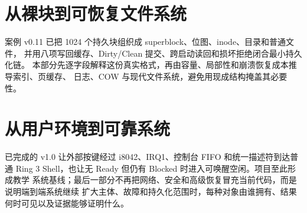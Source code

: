 \documentclass[UTF8,openany,zihao=5,fontset=none]{ctexbook}
\begin{document}
\part{从裸块到可恢复文件系统}
\begin{partbridge}
案例 v0.11 已把 1024 个持久块组织成 superblock、位图、inode、目录和普通文件，
并用八项写回缓存、Dirty/Clean 提交、跨启动读回和损坏拒绝闭合最小持久化链。
本部分先逐字段解释这份真实格式，再由容量、局部性和崩溃恢复成本推导索引、页缓存、
日志、COW 与现代文件系统，避免用现成结构掩盖其必要性。
\end{partbridge}






\part{从用户环境到可靠系统}
\begin{partbridge}
已完成的 v1.0 让外部按键经过 i8042、IRQ1、控制台 FIFO 和统一描述符到达普通
Ring 3 Shell，也让无 Ready 但仍有 Blocked 时进入可唤醒空闲。项目至此形成教学
系统基线；最后一部分不再把网络、安全和高级恢复冒充当前代码，而是说明端到端系统继续
扩大主体、故障和持久化范围时，每种对象由谁拥有、结果何时可见以及证据能够证明什么。
\end{partbridge}





\backmatter




\end{document}
